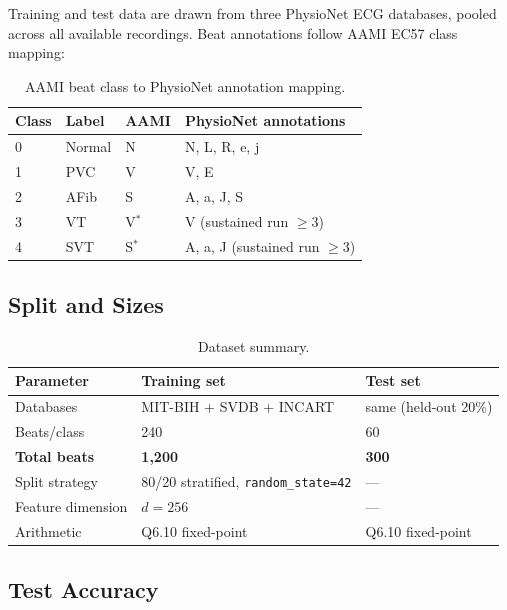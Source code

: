 \documentclass[11pt]{article}
\begin{document}
Training and test data are drawn from three PhysioNet ECG databases, pooled
across all available recordings.  Beat annotations follow AAMI EC57 class
mapping:

\begin{table}[H]
  \centering
  \caption{AAMI beat class to PhysioNet annotation mapping.}
  \label{tab:classes}
  \small
  \begin{tabular}{llll}
    \toprule
    Class & Label & AAMI & PhysioNet annotations \\
    \midrule
    0 & Normal    & N & N, L, R, e, j \\
    1 & PVC       & V & V, E \\
    2 & AFib      & S & A, a, J, S \\
    3 & VT        & V$^*$ & V (sustained run $\ge$3) \\
    4 & SVT       & S$^*$ & A, a, J (sustained run $\ge$3) \\
    \bottomrule
  \end{tabular}
\end{table}

\subsection{Split and Sizes}

\begin{table}[H]
  \centering
  \caption{Dataset summary.}
  \label{tab:dataset}
  \small
  \begin{tabular}{lll}
    \toprule
    Parameter & Training set & Test set \\
    \midrule
    Databases & MIT-BIH + SVDB + INCART & same (held-out 20\%) \\
    Beats/class & 240 & 60 \\
    \textbf{Total beats} & \textbf{1,200} & \textbf{300} \\
    Split strategy & 80/20 stratified, \texttt{random\_state=42} & --- \\
    Feature dimension & $d = 256$ & --- \\
    Arithmetic & Q6.10 fixed-point & Q6.10 fixed-point \\
    \bottomrule
  \end{tabular}
\end{table}

\subsection{Test Accuracy}
\end{document}
